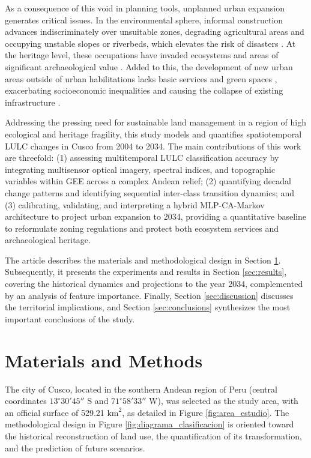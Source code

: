 \documentclass[runningheads]{llncs}
\begin{document}
As a consequence of this void in planning tools, unplanned urban expansion generates critical issues. In the environmental sphere, informal construction advances indiscriminately over unsuitable zones, degrading agricultural areas and occupying unstable slopes or riverbeds, which elevates the risk of disasters \cite{623_tupay}. At the heritage level, these occupations have invaded ecosystems and areas of significant archaeological value \cite{750_MendozaMamani2024}. Added to this, the development of new urban areas outside of urban habilitations lacks basic services and green spaces \cite{669_maestroeco}, exacerbating socioeconomic inequalities and causing the collapse of existing infrastructure \cite{809_Berrio2017Modelo}.

Addressing the pressing need for sustainable land management in a region of high ecological and heritage fragility, this study models and quantifies spatiotemporal LULC changes in Cusco from 2004 to 2034. The main contributions of this work are threefold: (1) assessing multitemporal LULC classification accuracy by integrating multisensor optical imagery, spectral indices, and topographic variables within GEE across a complex Andean relief; (2) quantifying decadal change patterns and identifying sequential inter-class transition dynamics; and (3) calibrating, validating, and interpreting a hybrid MLP-CA-Markov architecture to project urban expansion to 2034, providing a quantitative baseline to reformulate zoning regulations and protect both ecosystem services and archaeological heritage.

The article describes the materials and methodological design in Section \ref{sec:materials_methods}. Subsequently, it presents the experiments and results in Section \ref{sec:results}, covering the historical dynamics and projections to the year 2034, complemented by an analysis of feature importance. Finally, Section \ref{sec:discussion} discusses the territorial implications, and Section \ref{sec:conclusions} synthesizes the most important conclusions of the study.


\section{Materials and Methods}
\label{sec:materials_methods}

The city of Cusco, located in the southern Andean region of Peru (central coordinates $13^\circ 30' 45''$ S and $71^\circ 58' 33''$ W), was selected as the study area, with an official surface of 529.21 $\text{km}^2$, as detailed in Figure \ref{fig:area_estudio}. The methodological design in Figure \ref{fig:diagrama_clasificacion} is oriented toward the historical reconstruction of land use, the quantification of its transformation, and the prediction of future scenarios.
\end{document}
